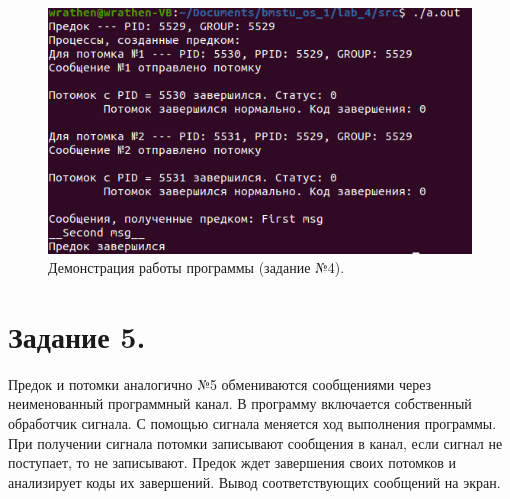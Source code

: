 \documentclass[12pt]{report}
\begin{document}
	\begin{figure}[H]
		
		\centering
		
		\includegraphics[width=\linewidth]{img/task_04.png}
		\caption{Демонстрация работы программы (задание №4).}
		
		\label{fig:task_04}
		
	\end{figure}

	\section*{Задание 5.}
	Предок и потомки аналогично №5 обмениваются сообщениями через неименованный программный канал.
	В программу включается собственный обработчик сигнала.
	С помощью сигнала меняется ход выполнения программы.
	При получении сигнала потомки записывают сообщения в канал, если сигнал не поступает, то не записывают.
	Предок ждет завершения своих потомков и анализирует коды их завершений.
	Вывод соответствующих сообщений на экран.
	
\end{document}
